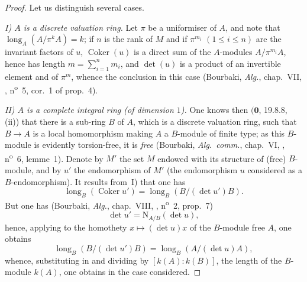 \begin{proof}
Let us distinguish several cases.

\emph{I) $A$ is a discrete valuation ring.}
Let $\pi$ be a uniformiser of $A$, and note that $\operatorname{long}_A(A/\pi^k A)=k$;
if $n$ is the rank of $M$ and if $\pi^{m_i}$ $(1\leq i\leq n)$ are the invariant factors of $u$, $\operatorname{Coker}(u)$ is a direct sum of the $A$-modules $A/\pi^{m_i}A$, hence has length $m=\sum_{i=1}^n m_i$, and $\det(u)$ is a product of an invertible element and of $\pi^m$, whence the conclusion in this case (Bourbaki, \emph{Alg.}, chap.~VII, , n\textsuperscript{o}~5, cor.~1 of prop.~4).

\emph{II) $A$ is a complete integral ring (of dimension $1$).}
One knows then $(\mathbf{0}$, 19.8.8, (ii)) that there is a sub-ring $B$ of $A$, which is a discrete valuation ring, such that $B\to A$ is a local homomorphism making $A$ a $B$-module of finite type;
as this $B$-module is evidently torsion-free, it is \emph{free} (Bourbaki, \emph{Alg.~comm.}, chap.~VI, , n\textsuperscript{o}~6, lemme~1).
Denote by $M'$ the set $M$ endowed with its structure of (free) $B$-module, and by $u'$ the endomorphism of $M'$ (the endomorphism $u$ considered as a $B$-endomorphism).
It results from~I) that one has
\[
\label{IV.21.10.17.5}
  \operatorname{long}_B(\operatorname{Coker} u')=\operatorname{long}_B(B/(\det u')B).
  \tag{21.10.17.5}
\]
But one has (Bourbaki, \emph{Alg.}, chap.~VIII, , n\textsuperscript{o}~2, prop.~7)
\[
  \det u'=\mathrm{N}_{A/B}(\det u),
\]
hence, applying  to the homothety $x\mapsto(\det u)x$ of the $B$-module free $A$, one obtains
\[
  \operatorname{long}_B(B/(\det u')B)=\operatorname{long}_B(A/(\det u)A),
\]
whence, substituting in  and dividing by $[k(A):k(B)]$, the length of the $B$-module $k(A)$, one obtains  in the case considered.


\end{proof}
